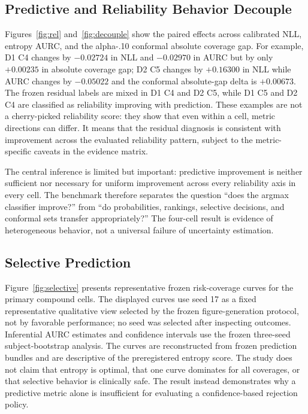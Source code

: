 \documentclass[11pt]{article}
\begin{document}
\subsection{Predictive and Reliability Behavior Decouple}
Figures~\ref{fig:rel} and~\ref{fig:decouple} show the paired effects across calibrated NLL, entropy AURC, and the alpha-.10 conformal absolute coverage gap. For example, D1 C4 changes by $-0.02724$ in NLL and $-0.02970$ in AURC but by only $+0.00235$ in absolute coverage gap; D2 C5 changes by $+0.16300$ in NLL while AURC changes by $-0.05022$ and the conformal absolute-gap delta is $+0.00673$. The frozen residual labels are mixed in D1 C4 and D2 C5, while D1 C5 and D2 C4 are classified as reliability improving with prediction. These examples are not a cherry-picked reliability score: they show that even within a cell, metric directions can differ. It means that the residual diagnosis is consistent with improvement across the evaluated reliability pattern, subject to the metric-specific caveats in the evidence matrix.

The central inference is limited but important: predictive improvement is neither sufficient nor necessary for uniform improvement across every reliability axis in every cell. The benchmark therefore separates the question “does the argmax classifier improve?” from “do probabilities, rankings, selective decisions, and conformal sets transfer appropriately?” The four-cell result is evidence of heterogeneous behavior, not a universal failure of uncertainty estimation.

\subsection{Selective Prediction}
Figure~\ref{fig:selective} presents representative frozen risk-coverage curves for the primary compound cells. The displayed curves use seed 17 as a fixed representative qualitative view selected by the frozen figure-generation protocol, not by favorable performance; no seed was selected after inspecting outcomes. Inferential AURC estimates and confidence intervals use the frozen three-seed subject-bootstrap analysis. The curves are reconstructed from frozen prediction bundles and are descriptive of the preregistered entropy score. The study does not claim that entropy is optimal, that one curve dominates for all coverages, or that selective behavior is clinically safe. The result instead demonstrates why a predictive metric alone is insufficient for evaluating a confidence-based rejection policy.
\end{document}
